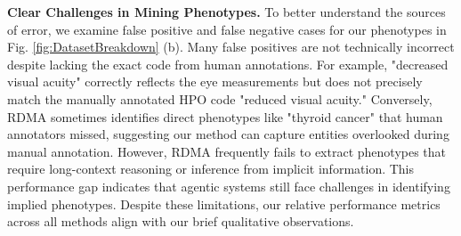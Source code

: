 \textbf{Clear Challenges in Mining Phenotypes.} To better understand the sources of error, we examine false positive and false negative cases for our phenotypes in Fig. \ref{fig:DatasetBreakdown} (b). Many false positives are not technically incorrect despite lacking the exact code from human annotations. For example, "decreased visual acuity" correctly reflects the eye measurements but does not precisely match the manually annotated HPO code "reduced visual acuity." Conversely, RDMA sometimes identifies direct phenotypes like "thyroid cancer" that human annotators missed, suggesting our method can capture entities overlooked during manual annotation. However, RDMA frequently fails to extract phenotypes that require long-context reasoning or inference from implicit information. This performance gap indicates that agentic systems still face challenges in identifying implied phenotypes. Despite these limitations, our relative performance metrics across all methods align with our brief qualitative observations.